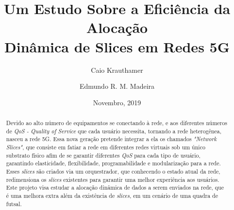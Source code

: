 \documentclass[11pt,twoside]{article}
\begin{document}
% 

%



\TRMakeCover


%
\pagestyle{myheadings}

%
\title{Um Estudo Sobre a Eficiência da Alocação \\ Dinâmica de Slices em Redes 5G}

\author{Caio Krauthamer \and Edmundo R. M. Madeira}

\date{Novembro, 2019}

\maketitle


\begin{abstract} 
  	Devido ao alto número de equipamentos se conectando à rede, e aos diferentes números de \textit{QoS - Quality of Service} que cada usuário necessita, tornando a rede heterogênea, nasceu a rede 5G. Essa nova geração pretende integrar a ela os chamados \textit{"Network Slices"}, que consiste em fatiar a rede em diferentes redes virtuais sob um único substrato físico afim de se garantir diferentes \textit{QoS} para cada tipo de usuário, garantindo elasticidade, flexibilidade, programabilidade e modularização para a rede. Esses \textit{slices} são criados via um orquestrador, que conhecendo o estado atual da rede, redimensiona os \textit{slices} existentes para garantir uma melhor experiência aos usuários. Este projeto visa estudar a alocação dinâmica de dados a serem enviados na rede, que é uma melhora extra além da existência de \textit{slices}, em um cenário de uma quadra de futsal.
\end{abstract}
\end{document}

